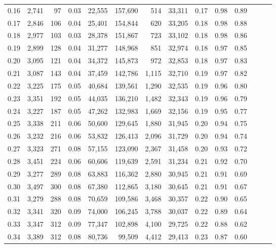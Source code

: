 \begin{tabular}{rrrrrrrrrrrrrr}
0.16 &  2,741 &   97 &  0.03 &   22,555 &  157,690 &     514 &  33,311 &  0.17 &  0.98 &      0.89 \\
0.17 &  2,846 &  106 &  0.04 &   25,401 &  154,844 &     620 &  33,205 &  0.18 &  0.98 &      0.88 \\
0.18 &  2,977 &  103 &  0.03 &   28,378 &  151,867 &     723 &  33,102 &  0.18 &  0.98 &      0.86 \\
0.19 &  2,899 &  128 &  0.04 &   31,277 &  148,968 &     851 &  32,974 &  0.18 &  0.97 &      0.85 \\
0.20 &  3,095 &  121 &  0.04 &   34,372 &  145,873 &     972 &  32,853 &  0.18 &  0.97 &      0.83 \\
0.21 &  3,087 &  143 &  0.04 &   37,459 &  142,786 &   1,115 &  32,710 &  0.19 &  0.97 &      0.82 \\
0.22 &  3,225 &  175 &  0.05 &   40,684 &  139,561 &   1,290 &  32,535 &  0.19 &  0.96 &      0.80 \\
0.23 &  3,351 &  192 &  0.05 &   44,035 &  136,210 &   1,482 &  32,343 &  0.19 &  0.96 &      0.79 \\
0.24 &  3,227 &  187 &  0.05 &   47,262 &  132,983 &   1,669 &  32,156 &  0.19 &  0.95 &      0.77 \\
0.25 &  3,338 &  211 &  0.06 &   50,600 &  129,645 &   1,880 &  31,945 &  0.20 &  0.94 &      0.75 \\
0.26 &  3,232 &  216 &  0.06 &   53,832 &  126,413 &   2,096 &  31,729 &  0.20 &  0.94 &      0.74 \\
0.27 &  3,323 &  271 &  0.08 &   57,155 &  123,090 &   2,367 &  31,458 &  0.20 &  0.93 &      0.72 \\
0.28 &  3,451 &  224 &  0.06 &   60,606 &  119,639 &   2,591 &  31,234 &  0.21 &  0.92 &      0.70 \\
0.29 &  3,277 &  289 &  0.08 &   63,883 &  116,362 &   2,880 &  30,945 &  0.21 &  0.91 &      0.69 \\
0.30 &  3,497 &  300 &  0.08 &   67,380 &  112,865 &   3,180 &  30,645 &  0.21 &  0.91 &      0.67 \\
0.31 &  3,279 &  288 &  0.08 &   70,659 &  109,586 &   3,468 &  30,357 &  0.22 &  0.90 &      0.65 \\
0.32 &  3,341 &  320 &  0.09 &   74,000 &  106,245 &   3,788 &  30,037 &  0.22 &  0.89 &      0.64 \\
0.33 &  3,347 &  312 &  0.09 &   77,347 &  102,898 &   4,100 &  29,725 &  0.22 &  0.88 &      0.62 \\
0.34 &  3,389 &  312 &  0.08 &   80,736 &   99,509 &   4,412 &  29,413 &  0.23 &  0.87 &      0.60 \\

\end{tabular}
